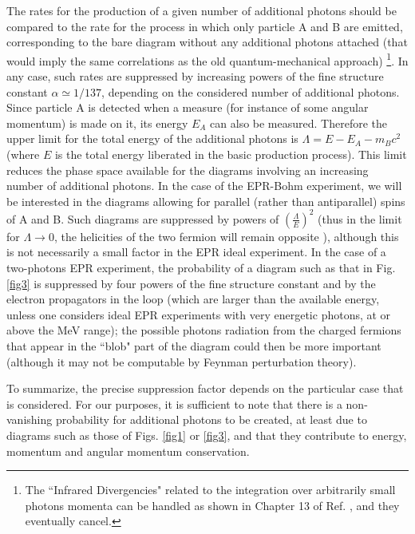 \documentclass[aps,prl,showkeys,showpacs,preprint,groupedaddress,12pt]{revtex4}
\begin{document}
The rates for the production of a given number of additional
photons should be compared to the rate for the process in which
only particle A and B are emitted, corresponding to the bare
diagram without any additional photons attached (that would imply
the same correlations as the old quantum-mechanical approach)
\footnote{The ``Infrared Divergencies" related to the integration
over arbitrarily small photons momenta can be handled as shown in
Chapter 13 of Ref. \cite{WeinbookI}, and they eventually
cancel.}. In any case, such rates are suppressed by increasing
powers of the fine structure constant $\alpha\simeq 1/137$,
depending on the considered number of additional photons. Since
particle A is detected when a measure (for instance of some
angular momentum) is made on it, its energy $E_A$ can also be
measured. Therefore the upper limit for the total energy of the
additional photons is $\Lambda=E-E_A-m_Bc^2$ (where $E$ is the
total energy liberated in the basic production process). This
limit reduces the phase space available for the diagrams involving
an increasing number of additional photons. In the case of the
EPR-Bohm experiment, we will be interested in the diagrams
allowing for parallel (rather than antiparallel) spins of A and B.
Such diagrams are suppressed by powers of
$\left(\frac{\Lambda}{E}\right)^2$ (thus in the limit for
$\Lambda\to0$, the helicities of the two fermion will remain
opposite \cite{WeinbookI}), although this is not necessarily a
small factor in the EPR ideal experiment. In the case of a
two-photons EPR experiment, the probability of a diagram such as
that in Fig. \ref{fig3} is suppressed by four powers of the fine
structure constant and by the electron propagators in the loop
(which are larger than the available energy, unless one considers
ideal EPR experiments with very energetic photons, at or above the
MeV range); the possible photons radiation from the charged
fermions that appear in the ``blob" part of the diagram could then
be more important (although it may not be computable by Feynman
perturbation theory).

To summarize, the precise suppression factor depends on the
particular case that is considered. For our purposes, it is
sufficient to note that there is a non-vanishing probability for
additional photons to be created, at least due to diagrams such as
those of Figs. \ref{fig1} or \ref{fig3}, and that they contribute
to energy, momentum and angular momentum conservation.
\end{document}

